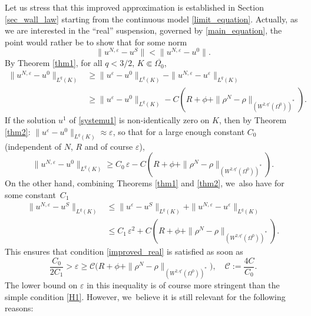 \documentclass[10pt]{amsart}
\theoremstyle{plain}
\theoremstyle{definition}
\let\eps\varepsilon
\begin{document}
Let us stress that this improved approximation is established in Section \ref{sec_wall_law} starting from the continuous model \eqref{limit_equation}. Actually, as we are interested in the ``real'' suspension, governed by \eqref{main_equation}, the point would rather be to show that for some norm
\begin{equation} \label{improved_real}
\|u^{N,\eps} - u^S\| < \|u^{N,\eps} - u^0\|.
\end{equation}
By Theorem \ref{thm1}, for all $q < 3/2$, $K \Subset \overline{\Omega_0}$,
\begin{align*} \|u^{N,\eps} - u^0\|_{L^q(K)} &\ge \|u^\eps - u^0\|_{L^q(K)} - \|u^{N,\eps} - u^\eps\|_{L^q(K)}\\
&\ge \|u^\eps - u^0\|_{L^q(K)} - C (R+\phi + \|\rho^N-\rho\|_{(W^{2,q'}(\Omega^0))^*}).
\end{align*}
If the solution $u^1$ of \eqref{systemu1} is non-identically zero on $K$, then by Theorem \ref{thm2}: \hbox{$\|u^\eps - u^0\|_{L^q(K)} \approx \eps$}, so that for a large enough constant $C_0$ (independent of $N$, $R$ and of course $\eps$),
\[
\|u^{N,\eps} - u^0\|_{L^q(K)} \ge C_0 \, \eps - C (R+\phi + \|\rho^N-\rho\|_{(W^{2,q'}(\Omega^0))^*}).
\]
On the other hand, combining Theorems \ref{thm1} and \ref{thm2}, we~also have for some constant~$C_1$
\begin{align*}
\|u^{N,\eps} - u^S\|_{L^q(K)} &\le \|u^\eps - u^S\|_{L^q(K)} + \|u^{N,\eps} - u^\eps\|_{L^q(K)}\\
&\le C_1\,\eps^2 + C (R+\phi + \|\rho^N-\rho\|_{(W^{2,q'}(\Omega^0))^*}).
\end{align*}
This ensures that condition \eqref{improved_real} is satisfied as soon as
\begin{equation} \label{stronger_assumption_size}
\frac{C_0}{2 C_1} > \eps \ge \mathcal{C} \big(R+ \phi + \|\rho^N-\rho\|_{(W^{2,q'}(\Omega^0))^*} \big), \quad \mathcal{C} := \frac{4C}{C_0}.
\end{equation}
The lower bound on $\eps$ in this inequality is of course more stringent than the simple condition \eqref{H1}. However, we~believe it is still relevant for the following reasons:
\end{document}
